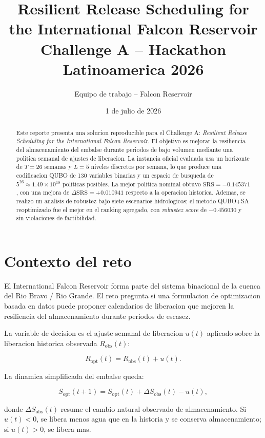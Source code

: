 \documentclass[11pt,letterpaper]{article}
\title{\textbf{Resilient Release Scheduling for the International Falcon Reservoir}\\
\large Challenge A -- Hackathon Latinoamerica 2026}
\author{Equipo de trabajo -- Falcon Reservoir}
\date{1 de julio de 2026}
\begin{document}
\maketitle

\begin{abstract}
Este reporte presenta una solucion reproducible para el Challenge A:
\textit{Resilient Release Scheduling for the International Falcon Reservoir}.
El objetivo es mejorar la resiliencia del almacenamiento del embalse durante
periodos de bajo volumen mediante una politica semanal de ajustes de liberacion.
La instancia oficial evaluada usa un horizonte de $T=26$ semanas y $L=5$
niveles discretos por semana, lo que produce una codificacion QUBO de 130
variables binarias y un espacio de busqueda de $5^{26}\approx 1.49\times10^{18}$
politicas posibles. La mejor politica nominal obtuvo
$\mathrm{SRS}=-0.145371$, con una mejora de
$\Delta\mathrm{SRS}=+0.010941$ respecto a la operacion historica. Ademas,
se realizo un analisis de robustez bajo siete escenarios hidrologicos; el
metodo QUBO+SA reoptimizado fue el mejor en el ranking agregado, con
\textit{robustez score} de $-0.456030$ y sin violaciones de factibilidad.
\end{abstract}

\section{Contexto del reto}

El International Falcon Reservoir forma parte del sistema binacional de la
cuenca del Rio Bravo / Rio Grande. El reto pregunta si una formulacion de
optimizacion basada en datos puede proponer calendarios de liberacion que
mejoren la resiliencia del almacenamiento durante periodos de escasez.

La variable de decision es el ajuste semanal de liberacion $u(t)$ aplicado
sobre la liberacion historica observada $R_{\mathrm{obs}}(t)$:

\begin{equation}
R_{\mathrm{opt}}(t) = R_{\mathrm{obs}}(t) + u(t).
\end{equation}

La dinamica simplificada del embalse queda:

\begin{equation}
S_{\mathrm{opt}}(t+1) =
S_{\mathrm{opt}}(t) + \Delta S_{\mathrm{obs}}(t) - u(t),
\end{equation}

donde $\Delta S_{\mathrm{obs}}(t)$ resume el cambio natural observado de
almacenamiento. Si $u(t)<0$, se libera menos agua que en la historia y se
conserva almacenamiento; si $u(t)>0$, se libera mas.
\end{document}
